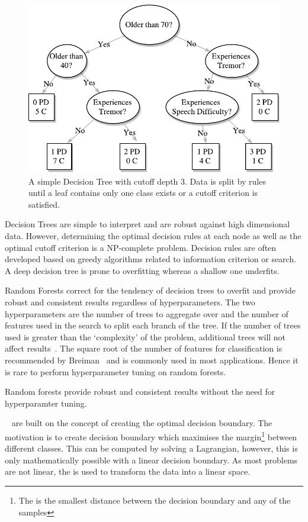 \documentclass[12pt, twoside]{book}
\renewcommand\emph[1]{\textit{\color{USred}{#1}}}
\begin{document}
\begin{figure}[h]
\label{decisiontree}
\centering\includegraphics[width=0.8\linewidth]{decisiontree.pdf}
\caption{A simple Decision Tree with cutoff depth 3. Data is split by rules until a leaf contains only one class exists or a cutoff criterion is satisfied.}
\end{figure}

Decision Trees are simple to interpret and are robust against high dimensional data. However, determining the optimal decision rules at each node as well as the optimal cutoff criterion is a NP-complete problem. Decision rules are often developed based on greedy algorithms related to information criterion or search. A deep decision tree is prone to overfitting whereas a shallow one underfits.

Random Forests correct for the tendency of decision trees to overfit and provide robust and consistent results regardless of hyperparameters. The two hyperparameters are the number of trees to aggregate over and the number of features used in the search to split each branch of the tree. If the number of trees used is greater than the `complexity' of the problem, additional trees will not affect results~\cite{treesinaforest}. The square root of the number of features for classification is recommended by Breiman~\cite{randomforests} and is commonly used in most applications. Hence it is rare to perform hyperparameter tuning on random forests.

\begin{highlight}
Random forests provide robust and consistent results without the need for hyperparamter tuning.
\end{highlight}

\emph{Support Vector Machines}~\cite{svm} are built on the concept of creating the optimal decision boundary. The motivation is to create decision boundary which maximises the margin\footnote{The \emph{margin} is the smallest distance between the decision boundary and any of the samples} between different classes. This can be computed by solving a Lagrangian, however, this is only mathematically possible with a linear decision boundary. As most problems are not linear, the \emph{kernel trick} is used to transform the data into a linear space.
\end{document}
